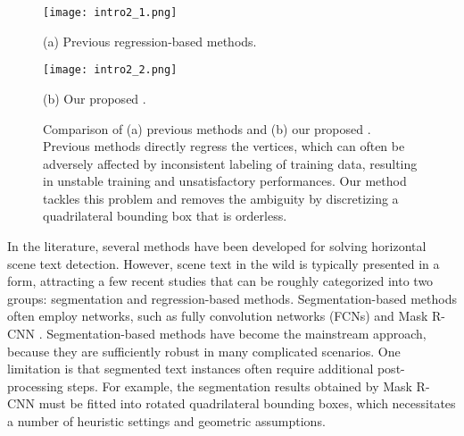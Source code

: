 \begin{figure}[t]
  \begin{minipage}[c]{0.49\linewidth}
    \centering
    \centerline{\texttt{[image: intro2\_1.png]}}
    \centerline{\small{\quad (a) Previous regression-based methods.}}\medskip
  \end{minipage}
  \hfill  \begin{minipage}[c]{0.49\linewidth}
    \centering
    \centerline{\texttt{[image: intro2\_2.png]}}
    \centerline{\small{(b) Our proposed \Ours. }}\medskip
  \end{minipage}
  
  \caption{Comparison of (a) previous methods and (b) our proposed \Ours. 
  Previous methods directly regress the vertices, which can often be adversely affected 
  by inconsistent labeling of training data, resulting in unstable training and unsatisfactory performances. Our method tackles this problem and removes the ambiguity by discretizing a quadrilateral bounding box that is orderless. 
  }\label{fig:intro_2}
\end{figure}





In the literature, several methods \cite{jaderberg2016reading,neumann2012real,neumann2015real,neumann2015efficient,tian2015text,tian2016detecting} have been developed for solving horizontal scene text detection. However, scene text in the wild is typically presented in a \multioriented form, attracting a few recent studies \cite{zhong2016deeptext,liu2017deep,shi2017detecting,xue2018accurate,xue2018accurate,xie2018scene,liu2019omnidirectional,liao2017textboxes,liao2018textboxes++,liao2018rotation,liu2018fots,he2017single,he2017deep} that can be roughly categorized into two groups: segmentation and regression-based methods. Segmentation-based methods often employ networks, such as fully convolution networks (FCNs) \cite{long2015fully} and Mask R-CNN \cite{he2017mask}. Segmentation-based methods have become 
the
mainstream
approach, because they are sufficiently robust in many complicated scenarios. One limitation is that segmented text instances often require additional post-processing steps. For example, the segmentation results obtained by Mask R-CNN must be fitted into rotated quadrilateral bounding boxes, which necessitates a number of heuristic settings and geometric assumptions.






